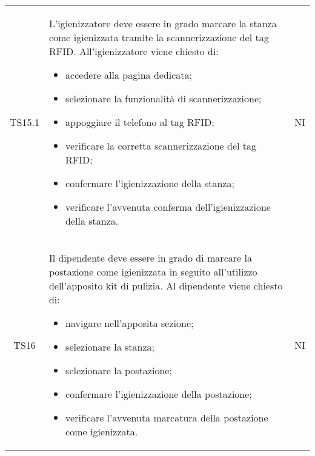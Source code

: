 {\begin{longtable}{ c C{11cm} c }
        TS15.1&
        \begin{flushleft}
            L'igienizzatore deve essere in grado marcare la stanza come igienizzata tramite la scannerizzazione del tag RFID.
            All'igienizzatore viene chiesto di:
        \end{flushleft}
        \begin{itemize}
            \item accedere alla pagina dedicata;
            \item selezionare la funzionalità di scannerizzazione;
            \item appoggiare il telefono al tag RFID;
            \item verificare la corretta scannerizzazione del tag RFID;
            \item confermare l'igienizzazione della stanza;
            \item verificare l'avvenuta conferma dell'igienizzazione della stanza.
        \end{itemize}&
        NI\\

        TS16&
        \begin{flushleft}
            Il dipendente deve essere in grado di marcare la postazione come igienizzata in seguito all'utilizzo dell'apposito kit di pulizia.
            Al dipendente viene chiesto di:
        \end{flushleft}
        \begin{itemize}
            \item navigare nell'apposita sezione;
            \item selezionare la stanza;
            \item selezionare la postazione;
            \item confermare l'igienizzazione della postazione;
            \item verificare l'avvenuta marcatura della postazione come igienizzata.
        \end{itemize}&
        NI\\


\end{longtable}}
